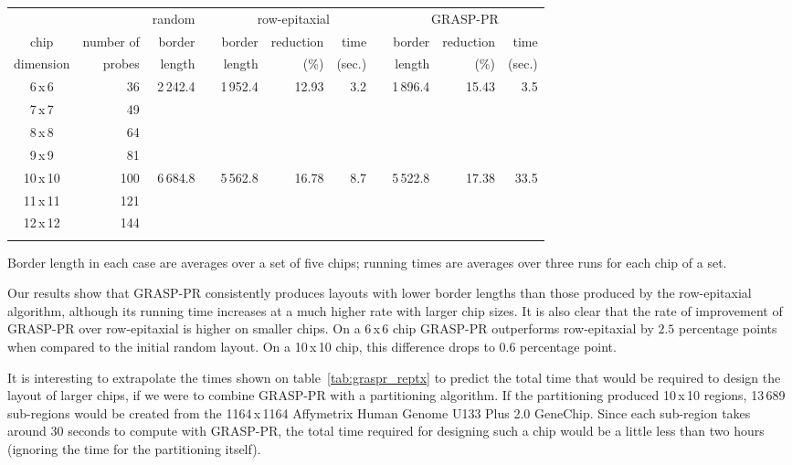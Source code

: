 \documentclass{bioinfo}
\begin{document}
\begin{table*}[t]
{\begin{tabular}{crrcrrrcrrr} \toprule
          &            & random & & \multicolumn{3}{c}{row-epitaxial}  & & \multicolumn{3}{c}{GRASP-PR}  \\ \cline{3-3} \cline{5-7} \cline{9-11}
chip      & number of  & border & & border & reduction & time          & & border & reduction & time   \\
dimension & probes     & length & & length & (\%)      & (sec.)        & & length & (\%)      & (sec.) \\ \midrule
6\,x\,6 & 36 & 2\,242.4 & & 1\,952.4 & 12.93 & 3.2 & & 1\,896.4 & 15.43 & 3.5 \\
7\,x\,7 & 49 & & & & & & & & & \\
8\,x\,8 & 64 & & & & & & & & & \\
9\,x\,9 & 81 & & & & & & & & & \\
10\,x\,10 & 100 & 6\,684.8 & & 5\,562.8 & 16.78 & 8.7 & & 5\,522.8 & 17.38 & 33.5 \\
11\,x\,11 & 121 & & & & & & & & & \\
12\,x\,12 & 144 & & & & & & & & & \\ \botrule
\end{tabular}}{Border length in each case are averages over a set of five chips; running times are averages over three runs for each chip of a set.}
\end{table*}

Our results show that GRASP-PR consistently produces layouts with lower border lengths than those produced by the row-epitaxial algorithm, although its running time increases at a much higher rate with larger chip sizes. It is also clear that the rate of improvement of GRASP-PR over row-epitaxial is higher on smaller chips. On a 6\,x\,6 chip GRASP-PR outperforms row-epitaxial by $2.5$ percentage points when compared to the initial random layout. On a 10\,x\,10 chip, this difference drops to $0.6$ percentage point.

It is interesting to extrapolate the times shown on table~\ref{tab:graspr_reptx} to predict the total time that would be required to design the layout of larger chips, if we were to combine GRASP-PR with a partitioning algorithm. If the partitioning produced 10\,x\,10 regions, 13\,689 sub-regions would be created from the 1164\,x\,1164 Affymetrix Human Genome U133 Plus 2.0 GeneChip\raisebox{.6ex}{\scriptsize \textregistered}. Since each sub-region takes around 30 seconds to compute with GRASP-PR, the total time required for designing such a chip would be a little less than two hours (ignoring the time for the partitioning itself).
\end{document}
